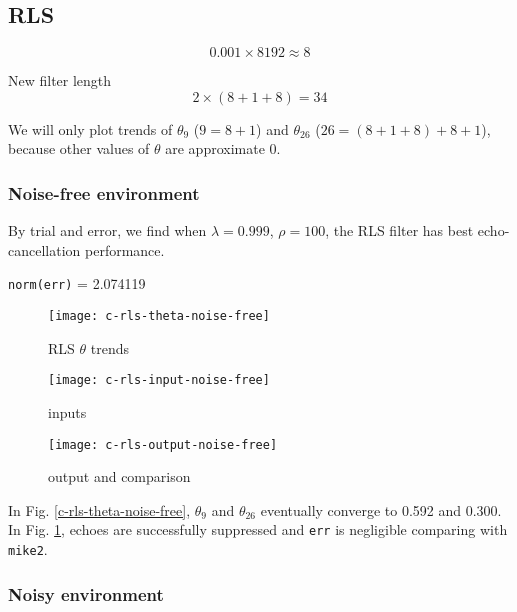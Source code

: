\documentclass{article}
\begin{document}
\subsection*{RLS}

\begin{equation*}
0.001 \times 8192 \approx 8
\end{equation*}

New filter length
\begin{equation*}
2 \times (8 + 1 + 8) = 34
\end{equation*}

We will only plot trends of $\theta_9$ ($9 = 8 + 1$) and $\theta_{26}$ ($26 = (8 + 1 + 8) + 8 + 1$), because other values of $\theta$ are approximate 0.

\subsubsection*{Noise-free environment}

By trial and error, we find when $\lambda = 0.999$, $\rho = 100$, the RLS filter has best echo-cancellation performance.
\begin{center}
\texttt{norm(err)} = 2.074119
\end{center}

\begin{figure}[H]
\begin{minipage}[t]{0.33\linewidth}
\centering
\texttt{[image: c-rls-theta-noise-free]}
\caption{RLS $\theta$ trends}
\label{c-rls-theta-noise-free}
\end{minipage}
\begin{minipage}[t]{0.33\linewidth}
\centering
\texttt{[image: c-rls-input-noise-free]}
\caption{inputs}
\end{minipage}
\begin{minipage}[t]{0.33\linewidth}
\centering
\texttt{[image: c-rls-output-noise-free]}
\caption{output and comparison}
\label{c-rls-output-noise-free}
\end{minipage}
\end{figure}

In Fig. \ref{c-rls-theta-noise-free}, $\theta_9$ and $\theta_{26}$ eventually converge to 0.592 and 0.300. In Fig. \ref{c-rls-output-noise-free}, echoes are successfully suppressed and \texttt{err} is negligible comparing with \texttt{mike2}.


\subsubsection*{Noisy environment}
\end{document}
